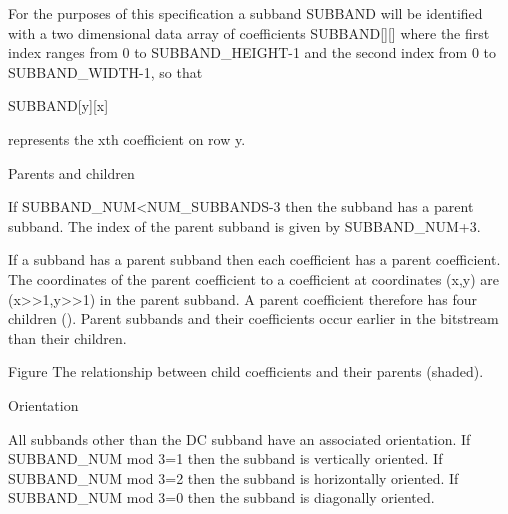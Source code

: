 For the purposes of this specification a subband SUBBAND will be
identified with a two dimensional data array of coefficients SUBBAND[][]
where the first index ranges from 0 to SUBBAND\_HEIGHT-1 and the second
index from 0 to SUBBAND\_WIDTH-1, so that

SUBBAND[y][x]

represents the xth coefficient on row y.

Parents and children

If SUBBAND\_NUM<NUM\_SUBBANDS-3 then the subband has a parent subband. The
index of the parent subband is given by SUBBAND\_NUM+3.

If a subband has a parent subband then each coefficient has a parent
coefficient. The coordinates of the parent coefficient to a coefficient
at coordinates (x,y) are (x>>1,y>>1) in the parent subband. A parent
coefficient therefore has four children (). Parent subbands and their
coefficients occur earlier in the bitstream than their children.




Figure  The relationship between child coefficients and their parents
(shaded).

Orientation

All subbands other than the DC subband have an associated orientation.
If SUBBAND\_NUM mod 3=1 then the subband is vertically oriented. If
SUBBAND\_NUM mod 3=2 then the subband is horizontally oriented. If
SUBBAND\_NUM mod 3=0 then the subband is diagonally oriented.



